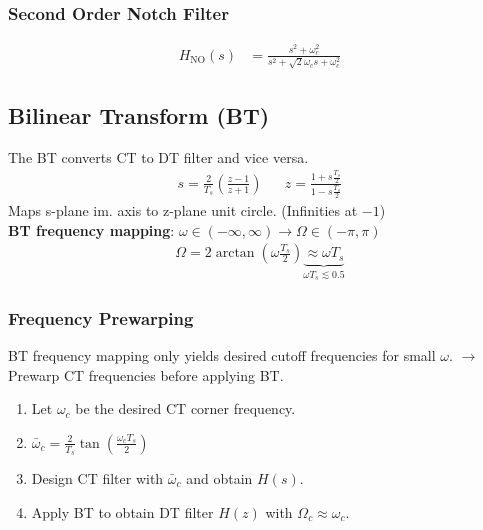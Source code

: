 	\subsubsection{Second Order Notch Filter}
		\vspace{-1em}
		\begin{align*}
			H_\text{NO}(s) &= \frac{s^2 + \omega_c^2}{s^2+\sqrt{2} \omega_c s + \omega_c^2}
		\end{align*}

\subsection{Bilinear Transform (BT)}
	The BT converts CT to DT filter and vice versa.
	\begin{align*}
		s = \frac{2}{T_s}\left(\frac{z-1}{z+1}\right) && z = \frac{1+s\frac{T_s}{2}}{1-s\frac{T_s}{2}}
	\end{align*}
	Maps s-plane im. axis to z-plane unit circle. (Infinities at $-1$)\\
	\textbf{BT frequency mapping}: \hfill 
	$\omega \in (-\infty,\infty) \rightarrow \Omega \in (-\pi , \pi)$
	\begin{align*}
		\Omega = 2\arctan\left(\omega\frac{T_s}{2}\right) \underbrace{\approx \omega T_s}_{\omega T_s \lesssim 0.5}
	\end{align*}
	\subsubsection{Frequency Prewarping}
		
		BT frequency mapping only yields desired cutoff frequencies for small $\omega$. $\rightarrow$ Prewarp CT frequencies before applying BT.
		\begin{enumerate}
			\item Let $\omega_c$ be the desired CT corner frequency.
			\item $\bar{\omega}_c = \frac{2}{T_s} \tan\left(\frac{\omega_c T_s}{2}\right)$
			\item Design CT filter with $\bar{\omega}_c$ and obtain $H(s)$.
			\item Apply BT to obtain DT filter $H(z)$ with $\Omega_c \approx \omega_c$.
		\end{enumerate}